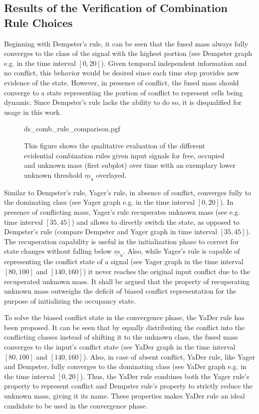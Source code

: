 \subsection{Results of the Verification of Combination Rule Choices}
\label{subsec:results_choice_comb_rule}
Beginning with Dempster's rule, it can be seen that the fused mass always fully converges to the class of the signal with the highest portion (see Dempster graph e.g. in the time interval $[0, 20]$). Given temporal independent information and no conflict, this behavior would be desired since each time step provides new evidence of the state. However, in presence of conflict, the fused mass should converge to a state representing the portion of conflict to represent cells being dynamic. Since Dempster's rule lacks the ability to do so, it is disqualified for usage in this work.
\begin{figure}[H]
	\begin{center}
		{ds_comb_rule_comparison.pgf}
		\caption{\label{fig:ds_comb_rule_comparison}This figure shows the qualitative evaluation of the different evidential combination rules given input signals for free, occupied and unknown mass (first subplot) over time with an exemplary lower unknown threshold $\underline{m}_u$ overlayed.}
	\end{center}
\end{figure} 
Similar to Dempster's rule, Yager's rule, in absence of conflict, converges fully to the dominating class (see Yager graph e.g. in the time interval $[0, 20]$). In presence of conflicting mass, Yager's rule recuperates unknown mass (see e.g. time interval $[35, 45]$) and allows to directly switch the state, as opposed to Dempster's rule (compare Dempster and Yager graph in time interval $[35, 45]$). The recuperation capability is useful in the initialization phase to correct for state changes without falling below $\underline{m}_u$. Also, while Yager's rule is capable of representing the conflict state of a signal (see Yager graph in the time interval $[80, 100]$ and $[140, 160]$) it never reaches the original input conflict due to the recuperated unknown mass. It shall be argued that the property of recuperating unknown mass outweighs the deficit of biased conflict representation for the purpose of initializing the occupancy state.  

To solve the biased conflict state in the convergence phase, the YaDer rule has been proposed. It can be seen that by equally distributing the conflict into the conflicting classes instead of shifting it to the unknown class, the fused mass converges to the input's conflict state (see YaDer graph in the time interval $[80, 100]$ and $[140, 160]$). Also, in case of absent conflict, YaDer rule, like Yager and Dempster, fully converges to the dominating class (see YaDer graph e.g. in the time interval $[0,20]$). Thus, the YaDer rule combines both the Yager rule's property to represent conflict and Dempster rule's property to strictly reduce the unknown mass, giving it its name. These properties makes YaDer rule an ideal candidate to be used in the convergence phase.

